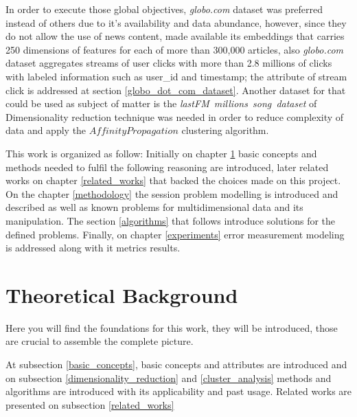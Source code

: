 \documentclass[ecp,tc,english]{iiufrgs}
\begin{document}
In order to execute those global objectives, \textit{globo.com} dataset was preferred instead of others due to it's availability and data abundance, however, since they do not allow the use of news content, \cite{moreira2018chameleon} made available its embeddings that carries 250 dimensions of features for each of more than 300,000 articles, also \textit{globo.com} dataset aggregates streams of user clicks with more than 2.8 millions of clicks with labeled information such as user\_id and timestamp; the attribute of stream click is addressed at section \ref{globo_dot_com_dataset}. Another dataset for that could be used as subject of matter is the \textit{lastFM\ millions\ song\ dataset} of \cite{bertin2011million}
Dimensionality reduction technique was needed in order to reduce complexity of data and apply the \(Affinity Propagation\) clustering algorithm. 

This work is organized as follow: Initially on chapter \ref{theoretical_background} basic concepts and methods needed to fulfil the following reasoning are introduced, later related works on chapter \ref{related_works} that backed the choices made on this project. On the chapter \ref{methodology} the session problem modelling is introduced and described as well as known problems for multidimensional data and its manipulation. The section \ref{algorithms} that follows introduce solutions for the defined problems.
Finally, on chapter \ref{experiments} error measurement modeling is addressed along with it metrics results.


\chapter{Theoretical Background} \label{theoretical_background}
Here you will find the foundations for this work, they will be introduced, those are crucial to assemble the complete picture.

At subsection \ref{basic_concepts}, basic concepts and attributes are introduced and on subsection \ref{dimensionality_reduction} and \ref{cluster_analysis} methods and algorithms are introduced with its applicability and past usage. Related works are presented on subsection \ref{related_works}
\end{document}
